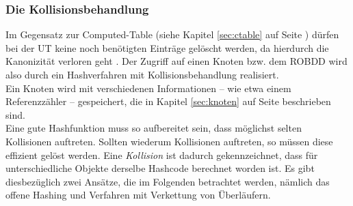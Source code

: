 \subsubsection{Die Kollisionsbehandlung}
\label{sec:collision}
Im Gegensatz zur Computed-Table (siehe Kapitel \ref{sec:ctable} auf Seite \pageref{sec:ctable}) dürfen bei der UT keine noch benötigten Einträge gelöscht werden, da hierdurch die Kanonizität verloren geht \cite[S.49]{s2007}. Der Zugriff auf einen Knoten bzw. dem ROBDD wird also durch ein Hashverfahren mit Kollisionsbehandlung realisiert.\\
Ein Knoten wird mit verschiedenen Informationen -- wie etwa einem Referenzzähler -- gespeichert, die in Kapitel \ref{sec:knoten} auf Seite \pageref{sec:knoten} beschrieben sind.\\
Eine gute Hashfunktion muss so aufbereitet sein, dass möglichst selten Kollisionen auftreten. Sollten wiederum Kollisionen auftreten, so müssen diese effizient gelöst werden. Eine \emph{Kollision} ist dadurch gekennzeichnet, dass für unterschiedliche Objekte derselbe Hashcode berechnet worden ist. Es gibt diesbezüglich zwei Ansätze, die im Folgenden betrachtet werden, nämlich das offene Hashing und Verfahren mit Verkettung von Überläufern.

